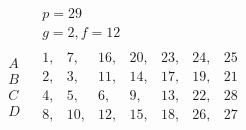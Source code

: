 \documentclass[twoside,12pt]{memoir}
\begin{document}
\[\begin{aligned}
& \begin{array}{c} p=29 \\  g=2, f=12 \end{array} \\
\begin{array}{l} A \\ B \\ C \\D \end{array} & 
\begin{array}{|rrrrrrr} 1,&7,&16,&20,&23,&24,&25\\ 
2,& 3,&11,&14,&17,&19,&21 \\ 
4,& 5,&6,&9,&13,&22,&28 \\ 
8,& 10,& 12,&15,&18,& 26,&27
\end{array} 
\end{aligned}\]\pagebreak%
\end{document}

